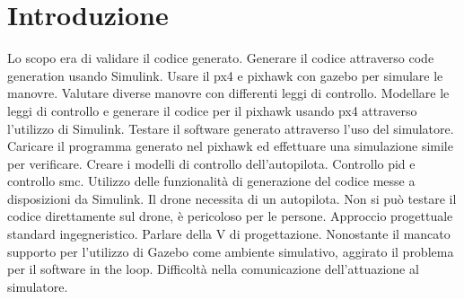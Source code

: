 \chapter{Introduzione}
\begin{commento}
	Lo scopo era di validare il codice generato.
	Generare il codice attraverso code generation usando Simulink.
	Usare il px4 e pixhawk con gazebo per simulare le manovre.
	Valutare diverse manovre con differenti leggi di controllo.
	Modellare le leggi di controllo e generare il codice per il pixhawk usando px4 attraverso l'utilizzo di Simulink.
	Testare il software generato attraverso l'uso del simulatore. Caricare il programma generato nel pixhawk ed effettuare una simulazione simile per verificare.
	Creare i modelli di controllo dell'autopilota.
	Controllo pid e controllo smc.
	Utilizzo delle funzionalità di generazione del codice messe a disposizioni da Simulink.
	Il drone necessita di un autopilota.
	Non si può testare il codice direttamente sul drone, è pericoloso per le persone.
	Approccio progettuale standard ingegneristico.
	Parlare della V di progettazione.
	Nonostante il mancato supporto per l'utilizzo di Gazebo come ambiente simulativo, aggirato il problema per il software in the loop.
	Difficoltà nella comunicazione dell'attuazione al simulatore.
\end{commento}

